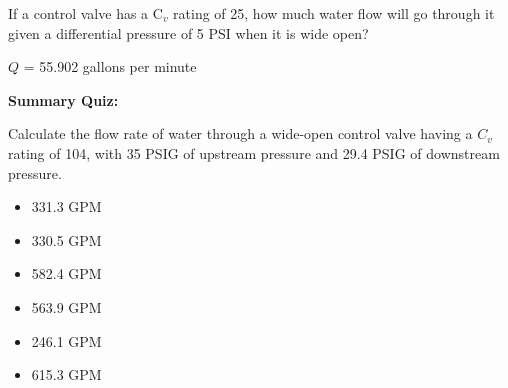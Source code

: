 

If a control valve has a C$_{v}$ rating of 25, how much water flow will go through it given a differential pressure of 5 PSI when it is wide open?







$Q$ = 55.902 gallons per minute
 






\vfil \eject

\noindent
{\bf Summary Quiz:}

Calculate the flow rate of water through a wide-open control valve having a $C_v$ rating of 104, with 35 PSIG of upstream pressure and 29.4 PSIG of downstream pressure.

\begin{itemize}
\item{} 331.3 GPM
\vskip 5pt 
\item{} 330.5 GPM
\vskip 5pt 
\item{} 582.4 GPM
\vskip 5pt 
\item{} 563.9 GPM
\vskip 5pt 
\item{} 246.1 GPM
\vskip 5pt 
\item{} 615.3 GPM
\end{itemize}





